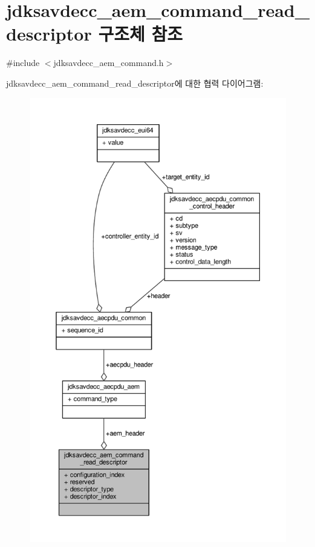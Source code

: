 \hypertarget{structjdksavdecc__aem__command__read__descriptor}{}\section{jdksavdecc\+\_\+aem\+\_\+command\+\_\+read\+\_\+descriptor 구조체 참조}
\label{structjdksavdecc__aem__command__read__descriptor}


{\ttfamily \#include $<$jdksavdecc\+\_\+aem\+\_\+command.\+h$>$}



jdksavdecc\+\_\+aem\+\_\+command\+\_\+read\+\_\+descriptor에 대한 협력 다이어그램\+:
\nopagebreak
\begin{figure}[H]
\begin{center}
\leavevmode
\includegraphics[height=550pt]{structjdksavdecc__aem__command__read__descriptor__coll__graph}
\end{center}
\end{figure}
